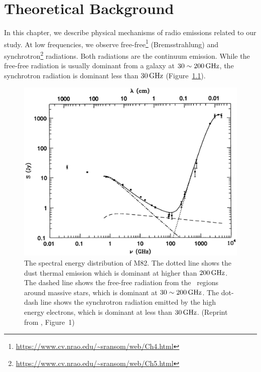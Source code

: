 \chapter{Theoretical Background}\label{chap:theory}
\begin{chapabstract}

    In this chapter, we describe physical mechanisms of radio emissions related to our study.
    At low frequencies, we observe free-free\footnote{\url{https://www.cv.nrao.edu/~sransom/web/Ch4.html}} (Bremsstrahlung) and synchrotron\footnote{\url{https://www.cv.nrao.edu/~sransom/web/Ch5.html}} radiations.
    Both radiations are the continuum emission.
    While the free-free radiation is usually dominant from a galaxy at $30 \sim 200\,\mathrm{GHz}$, the synchrotron radiation is dominant less than $30\,\mathrm{GHz}$ (Figure~\ref{fig:Condon1992_figure1}).\\ \vspace{0.2cm}
\begin{figure}[htbp]
	\centering
	\includegraphics[width=.7\linewidth]{Chapter_2/Figures/Condon1992_Figure1.png}
    \caption[The spectral energy distribution of M82]{\label{fig:Condon1992_figure1}
        The spectral energy distribution of M82.
        The dotted line shows the dust thermal emission which is dominant at higher than $200\,\mathrm{GHz}$.
        The dashed line shows the free-free radiation from the \ih~regions around massive stars, which is dominant at $30 \sim 200\,\mathrm{GHz}$.
        The dot-dash line shows the synchrotron radiation emitted by the high energy electrons, which is dominant at less than $30\,\mathrm{GHz}$.
        (Reprint from \citealt{Condon1992a}, Figure~1)
    }
\end{figure}

\end{chapabstract}



